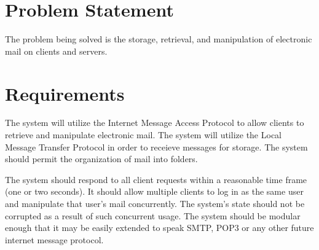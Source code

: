 \documentclass[a4paper,12pt]{article}
\begin{document}

\section*{Problem Statement}

The problem being solved is the storage, retrieval, and manipulation of electronic mail on clients and servers.

\section*{Requirements}

The system will utilize the Internet Message Access Protocol to allow clients to retrieve and manipulate electronic mail. The system will utilize the Local Message Transfer Protocol in order to receieve messages for storage. The system should permit the organization of mail into folders.

The system should respond to all client requests within a reasonable time frame (one or two seconds). It should allow multiple clients to log in as the same user and manipulate that user's mail concurrently. The system's state should not be corrupted as a result of such concurrent usage. The system should be modular enough that it may be easily extended to speak SMTP, POP3 or any other future internet message protocol.
\end{document}
